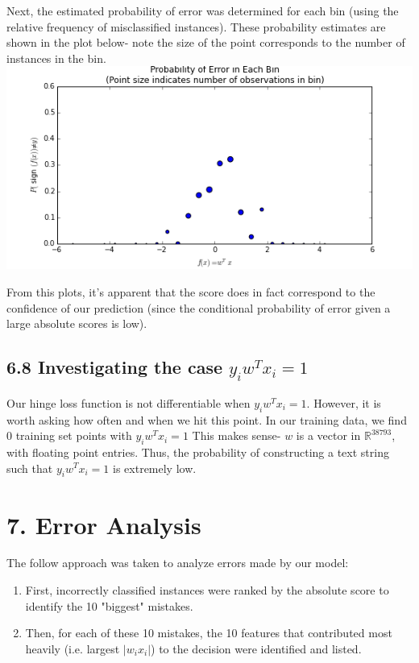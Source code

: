 \documentclass[paper=a4, fontsize=11pt]{scrartcl} %
\numberwithin{equation}{section} %
\numberwithin{figure}{section} %
\numberwithin{table}{section} %
\begin{document}
Next, the estimated probability of error was determined for each bin (using the relative frequency of misclassified instances). These  probability estimates are shown in the plot below- note the size of the point corresponds to the number of instances in the bin. \\

\includegraphics[scale = 0.65] {./../figures/6_7_b.png}

From this plots, it's apparent that the score does in fact correspond to the confidence of our prediction (since the conditional probability of error given a large absolute scores is low).

\subsection*{6.8 Investigating the case $y_iw^T x_i = 1$}

Our hinge loss function is not differentiable when $y_iw^T x_i = 1$. However, it is worth asking how often and when we hit this point. In our training data, we find 0 training set points with $y_iw^T x_i = 1$ This makes sense- $w$ is a vector in $\mathbb{R}^{38793}$, with floating point entries. Thus, the probability of constructing a text string such that $y_iw^T x_i = 1$ is extremely low.



\section*{7. Error Analysis}

The follow approach was taken to analyze errors made by our model:
\begin{enumerate}
\item First, incorrectly classified instances were ranked by the absolute score to identify the 10 "biggest" mistakes.
\item Then, for each of these 10 mistakes, the 10 features that contributed most heavily (i.e. largest $|w_i x_i|$) to the decision were identified and listed.
\end{enumerate}
\end{document}
